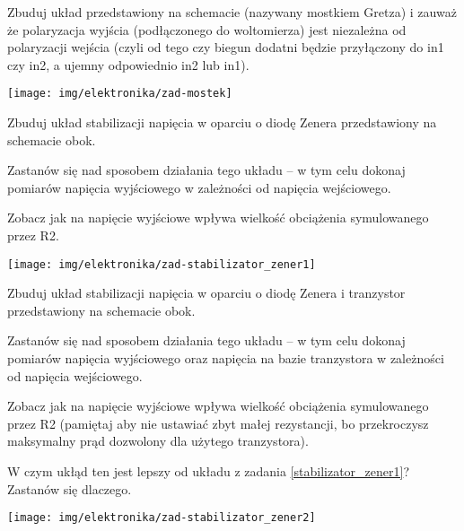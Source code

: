 \dbEntryCheckResults
\noindent\begin{minipage}[b]{0.6\textwidth}
Zbuduj układ przedstawiony na schemacie (nazywany mostkiem Gretza) i zauważ że polaryzacja wyjścia (podłączonego do woltomierza) jest niezależna od polaryzacji wejścia (czyli od tego czy biegun dodatni będzie przyłączony do in1 czy in2, a ujemny odpowiednio in2 lub in1).
\end{minipage}
\hfill
\begin{minipage}[b]{0.35\textwidth}
\texttt{[image: img/elektronika/zad-mostek]}
\end{minipage}
\fi


\dbEntryCheckResults
\noindent\begin{minipage}[b]{0.77\textwidth}
Zbuduj układ stabilizacji napięcia w oparciu o diodę Zenera przedstawiony na schemacie obok.

Zastanów się nad sposobem działania tego układu – w tym celu dokonaj pomiarów napięcia wyjściowego w zależności od napięcia wejściowego.

Zobacz jak na napięcie wyjściowe wpływa wielkość obciążenia symulowanego przez R2.
\vspace{13pt}
\end{minipage}
\hfill
\begin{minipage}[b]{0.17\textwidth}
\texttt{[image: img/elektronika/zad-stabilizator\_zener1]}
\end{minipage}
\fi


\dbEntryCheckResults
\noindent\begin{minipage}[b]{0.7\textwidth}
Zbuduj układ stabilizacji napięcia w oparciu o diodę Zenera i tranzystor przedstawiony na schemacie obok.

Zastanów się nad sposobem działania tego układu – w tym celu dokonaj pomiarów napięcia wyjściowego oraz napięcia na bazie tranzystora w zależności od napięcia wejściowego.

Zobacz jak na napięcie wyjściowe wpływa wielkość obciążenia symulowanego przez R2 (pamiętaj aby nie ustawiać zbyt małej rezystancji, bo przekroczysz maksymalny prąd dozwolony dla użytego tranzystora).

W czym ukłąd ten jest lepszy od układu z zadania \ref{stabilizator_zener1}? Zastanów się dlaczego.
\end{minipage}
\hfill
\begin{minipage}[b]{0.25\textwidth}
\texttt{[image: img/elektronika/zad-stabilizator\_zener2]}
\end{minipage}
\fi


